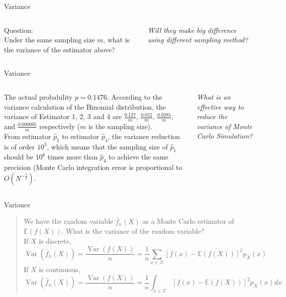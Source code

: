 \begin{frame}{Variance}
\begin{columns}[c]
\column{1.0\fullcolwidth}
Question: \\
Under the same sampling size $m$, what is the variance of the estimator above?

\emph{Will they make big difference using different sampling method?}
\column{0\fullcolwidth}
\end{columns}
\end{frame}

\begin{frame}{Variance}
\begin{columns}[c]
\column{1.0\fullcolwidth}
The actual probability $p=0.1476$. According to the variance calculation of the Binomial distribution, the variance of Estimator 1, 2, 3 and 4 are $\frac{0.127}{m}$, $\frac{0.052}{m}$, $\frac{0.0285}{m}$, and $\frac{0.000095}{m}$ respectively ($m$ is the sampling size).\\
From estimator $\hat{p}_{1}$ to estimator $\hat{p}_{4}$, the variance reduction is of order $10^{3}$, which means that the sampling size of $\hat{p}_{1}$ should be $10^{6}$ times more than $\hat{p}_{4}$ to achieve the same precision (Monte Carlo integration error is proportional to $O(N^{-\frac{1}{2}})$.

\emph{What is an effective way to reduce the variance of Monte Carlo Simulation?}
\column{0\fullcolwidth}
\end{columns}
\end{frame}

\begin{frame}{Variance}
\begin{quote}
We have the random variable $\widetilde{f_{n}}(X)$ as a Monte Carlo estimator of $\mathbb{E}(f(X))$. What is the variance of the random variable?\\
If $X$ is discrete,\\
\[ \operatorname{Var}\left(\widetilde{f_{n}}(X)\right)=\frac{\operatorname{Var}(f(X))}{n}=\frac{1}{n} \sum_{x \in \mathcal{X}}[f(x)-\mathbb{E}(f(X))]^{2} p_{X}(x)\]
If $X$ is continuous,\\
\[ \operatorname{Var}\left(\widetilde{f_{n}}(X)\right)=\frac{\operatorname{Var}(f(X))}{n}=\frac{1}{n} \int_{x \in \mathcal{X}}[f(x)-\mathbb{E}(f(X))]^{2} p_{X}(x) d x\]

\end{quote}
\end{frame}

